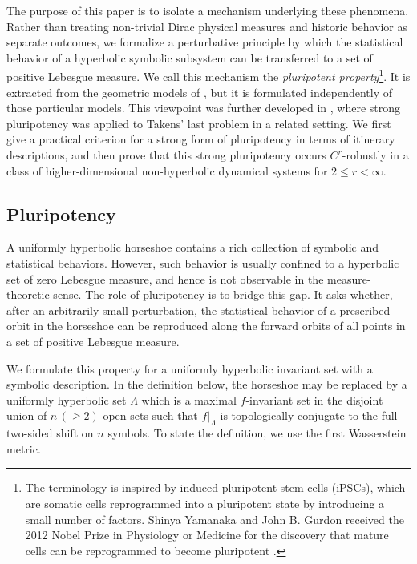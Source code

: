\documentclass{amsart}
\theoremstyle{definition}
\numberwithin{equation}{section}
\numberwithin{figure}{section}
\begin{document}
The purpose of this paper is to isolate a mechanism underlying these phenomena. 
Rather than treating non-trivial Dirac physical measures and historic behavior as separate outcomes, we formalize a perturbative principle by which the statistical behavior of a hyperbolic symbolic subsystem can be transferred to a set of positive Lebesgue measure. 
We call this mechanism the \emph{pluripotent property}\footnote{
The terminology is inspired by induced pluripotent stem cells (iPSCs), 
which are somatic cells reprogrammed into a pluripotent state by introducing a small number of factors. 
Shinya Yamanaka and John B.\! Gurdon received the 2012 Nobel Prize in Physiology or Medicine 
for the discovery that mature cells can be reprogrammed to become pluripotent \cite{Yam12}. 
}. 
It is extracted from the geometric models of \cite{CV01,KNS23}, but it is formulated independently of those particular models. 
This viewpoint was further developed in \cite{KLNSV25}, where strong pluripotency was applied to Takens' last problem in a related setting. 
We first give a practical criterion for a strong form of pluripotency in terms of itinerary descriptions, and then prove that this strong pluripotency occurs $C^r$-robustly in a class of higher-dimensional non-hyperbolic dynamical systems for $2\le r<\infty$.



\subsection{Pluripotency}\label{ss_pluri_lem}

A uniformly hyperbolic horseshoe contains a rich collection of symbolic and statistical behaviors. However, such behavior is usually confined to a hyperbolic set of zero Lebesgue measure, and hence is not observable in the measure-theoretic sense. The role of pluripotency is to bridge this gap. It asks whether, after an arbitrarily small perturbation, the statistical behavior of a prescribed orbit in the horseshoe can be reproduced along the forward orbits of all points in a set of positive Lebesgue measure.

We formulate this property for a uniformly hyperbolic invariant set with a symbolic description. In the definition below, the horseshoe may be replaced by a uniformly hyperbolic set $\Lambda$ which is a maximal $f$-invariant set in the disjoint union of $n\,(\geq 2)$ open sets such that $f|_{\Lambda}$ is topologically conjugate to the full two-sided shift on $n$ symbols. To state the definition, we use the first Wasserstein metric.
\end{document}
